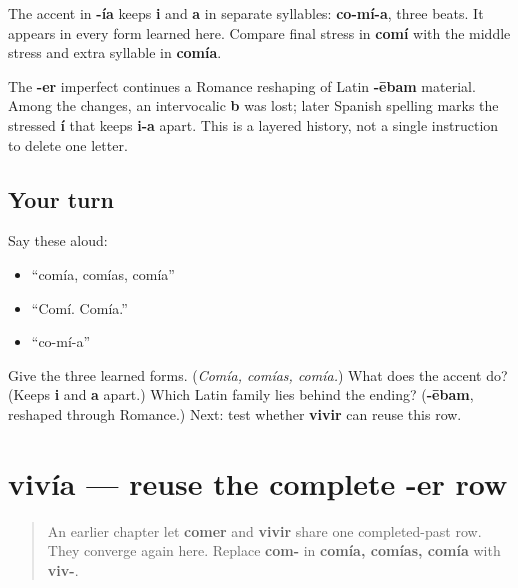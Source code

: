 \begin{grammarlens}[title={Grammar Lens: co-mí-a}]
The accent in \textbf{-ía} keeps \textbf{i} and \textbf{a} in separate syllables: \textbf{co-mí-a}, three beats. It appears in every form learned here. Compare final stress in \textbf{comí} with the middle stress and extra syllable in \textbf{comía}.
\end{grammarlens}

\begin{cousinweb}
The \textbf{-er} imperfect continues a Romance reshaping of Latin \textbf{-ēbam} material. Among the changes, an intervocalic \textbf{b} was lost; later Spanish spelling marks the stressed \textbf{í} that keeps \textbf{i-a} apart. This is a layered history, not a single instruction to delete one letter.
\end{cousinweb}

\subsection*{Your turn}
Say these aloud:

\begin{itemize}
\raggedright
  \item “comía, comías, comía”
  \item “Comí. Comía.”
  \item “co-mí-a”
\end{itemize}

\begin{tcolorbox}[breakable,colback=teal!4,colframe=teal!35!black,title={Before you move on}]
Give the three learned forms. (\emph{Comía, comías, comía.}) What does the accent do? (Keeps \textbf{i} and \textbf{a} apart.) Which Latin family lies behind the ending? (\textbf{-ēbam}, reshaped through Romance.) Next: test whether \textbf{vivir} can reuse this row.
\end{tcolorbox}
\section[vivía]{vivía — reuse the complete -er row}

\label{lesson:ES-C16-vivir-imperfecto}



\begin{quote}
An earlier chapter let \textbf{comer} and \textbf{vivir} share one completed-past row. They converge again here. Replace \textbf{com-} in \textbf{comía, comías, comía} with \textbf{viv-}.
\end{quote}

